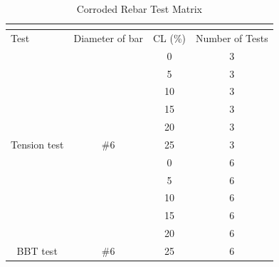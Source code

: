 \begin{table}[htb]
	\caption{Corroded Rebar Test Matrix}
	\label{tab:Test Matrix}
	\centering	
	\begin{tabular}{|c|c|c|c|}
	\hline
	\multicolumn{4}{|c|}{\cellcolor[HTML]{CC0000}{\color[HTML]{FFFFFF} Corroded rebar test matrix}}                                               \\ \hline
	\multicolumn{1}{|l|}{Test}     & \multicolumn{1}{l|}{Diameter of bar} & \multicolumn{1}{l|}{CL (\%)} & \multicolumn{1}{l|}{Number of Tests} \\ \hline
	                               &                                      & 0                            & 3                                    \\ \cline{3-4} 
	                               &                                      & 5                            & 3                                    \\ \cline{3-4} 
	                               &                                      & 10                           & 3                                    \\ \cline{3-4} 
	                               &                                      & 15                           & 3                                    \\ \cline{3-4} 
	                               &                                      & 20                           & 3                                    \\ \cline{3-4} 
	\multirow{-6}{*}{Tension test} & \multirow{-6}{*}{\#6}                & 25                           & 3                                    \\ \hline
	                               &                                      & 0                            & 6                                    \\ \cline{3-4} 
	                               &                                      & 5                            & 6                                    \\ \cline{3-4} 
	                               &                                      & 10                           & 6                                    \\ \cline{3-4} 
	                               &                                      & 15                           & 6                                    \\ \cline{3-4} 
	                               &                                      & 20                           & 6                                    \\ \cline{3-4} 
	\multirow{-6}{*}{BBT test}     & \multirow{-6}{*}{\#6}                & 25                           & 6                                    \\ \hline
	\end{tabular}
\end{table}

